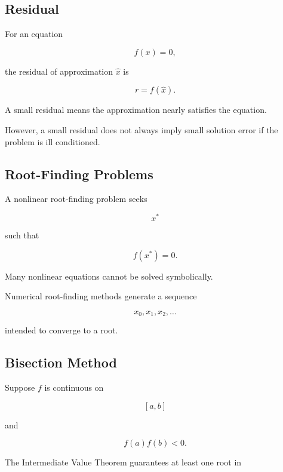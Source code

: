 \subsection{Residual}
\label{subsec:numerical-residual}

For an equation

\[
f(x)=0,
\]

the residual of approximation \(\widehat{x}\) is

\[
\boxed{
r
=
f(\widehat{x}).
}
\]

A small residual means the approximation nearly satisfies the equation.

However, a small residual does not always imply small solution error if the
problem is ill conditioned.

\subsection{Root-Finding Problems}
\label{subsec:root-finding-problems}

A nonlinear root-finding problem seeks

\[
\boxed{
x^*
}
\]

such that

\[
\boxed{
f(x^*)=0.
}
\]

Many nonlinear equations cannot be solved symbolically.

Numerical root-finding methods generate a sequence

\[
x_0,x_1,x_2,\ldots
\]

intended to converge to a root.

\subsection{Bisection Method}
\label{subsec:bisection-method}

Suppose \(f\) is continuous on

\[
[a,b]
\]

and

\[
\boxed{
f(a)f(b)<0.
}
\]

The Intermediate Value Theorem guarantees at least one root in

